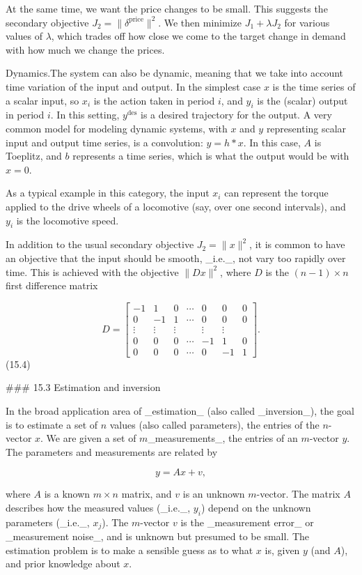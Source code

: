 At the same time, we want the price changes to be small. This suggests the secondary objective \(J_{2}=\|\delta^{\text{price}}\|^{2}\). We then minimize \(J_{1}+\lambda J_{2}\) for various values of \(\lambda\), which trades off how close we come to the target change in demand with how much we change the prices.

Dynamics.The system can also be dynamic, meaning that we take into account time variation of the input and output. In the simplest case \(x\) is the time series of a scalar input, so \(x_{i}\) is the action taken in period \(i\), and \(y_{i}\) is the (scalar) output in period \(i\). In this setting, \(y^{\text{des}}\) is a desired trajectory for the output. A very common model for modeling dynamic systems, with \(x\) and \(y\) representing scalar input and output time series, is a convolution: \(y=h*x\). In this case, \(A\) is Toeplitz, and \(b\) represents a time series, which is what the output would be with \(x=0\).

As a typical example in this category, the input \(x_{i}\) can represent the torque applied to the drive wheels of a locomotive (say, over one second intervals), and \(y_{i}\) is the locomotive speed.

In addition to the usual secondary objective \(J_{2}=\|x\|^{2}\), it is common to have an objective that the input should be smooth, _i.e._, not vary too rapidly over time. This is achieved with the objective \(\|Dx\|^{2}\), where \(D\) is the \((n-1)\times n\) first difference matrix

\[D=\left[\begin{array}{cccccc}-1&1&0&\cdots&0&0&0\\ 0&-1&1&\cdots&0&0&0\\ \vdots&\vdots&\vdots&&\vdots&\vdots\\ 0&0&0&\cdots&-1&1&0\\ 0&0&0&\cdots&0&-1&1\end{array}\right].\] (15.4)

### 15.3 Estimation and inversion

In the broad application area of _estimation_ (also called _inversion_), the goal is to estimate a set of \(n\) values (also called parameters), the entries of the \(n\)-vector \(x\). We are given a set of \(m\)_measurements_, the entries of an \(m\)-vector \(y\). The parameters and measurements are related by

\[y=Ax+v,\]

where \(A\) is a known \(m\times n\) matrix, and \(v\) is an unknown \(m\)-vector. The matrix \(A\) describes how the measured values (_i.e._, \(y_{i}\)) depend on the unknown parameters (_i.e._, \(x_{j}\)). The \(m\)-vector \(v\) is the _measurement error_ or _measurement noise_, and is unknown but presumed to be small. The estimation problem is to make a sensible guess as to what \(x\) is, given \(y\) (and \(A\)), and prior knowledge about \(x\).

